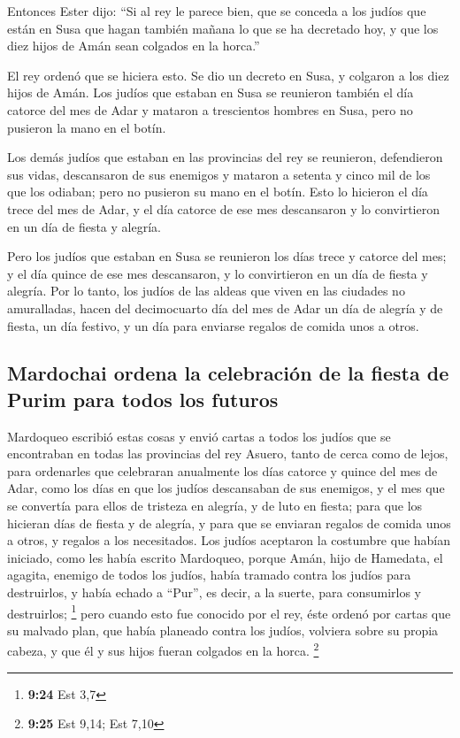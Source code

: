 \begin{paracol}{2}
 Entonces Ester dijo: ``Si al rey le parece bien, que se
conceda a los judíos que están en Susa que hagan también mañana lo que
se ha decretado hoy, y que los diez hijos de Amán sean colgados en la
horca.''

 El rey ordenó que se hiciera esto. Se dio un decreto en
Susa, y colgaron a los diez hijos de Amán.  Los judíos
que estaban en Susa se reunieron también el día catorce del mes de Adar
y mataron a trescientos hombres en Susa, pero no pusieron la mano en el
botín.

 Los demás judíos que estaban en las provincias del rey
se reunieron, defendieron sus vidas, descansaron de sus enemigos y
mataron a setenta y cinco mil de los que los odiaban; pero no pusieron
su mano en el botín.  Esto lo hicieron el día trece del
mes de Adar, y el día catorce de ese mes descansaron y lo convirtieron
en un día de fiesta y alegría.

 Pero los judíos que estaban en Susa se reunieron los
días trece y catorce del mes; y el día quince de ese mes descansaron, y
lo convirtieron en un día de fiesta y alegría.  Por lo
tanto, los judíos de las aldeas que viven en las ciudades no
amuralladas, hacen del decimocuarto día del mes de Adar un día de
alegría y de fiesta, un día festivo, y un día para enviarse regalos de
comida unos a otros.

\hypertarget{mardochai-ordena-la-celebraciuxf3n-de-la-fiesta-de-purim-para-todos-los-futuros}{%
\subsection{Mardochai ordena la celebración de la fiesta de Purim para
todos los
futuros}\label{mardochai-ordena-la-celebraciuxf3n-de-la-fiesta-de-purim-para-todos-los-futuros}}

 Mardoqueo escribió estas cosas y envió cartas a todos
los judíos que se encontraban en todas las provincias del rey Asuero,
tanto de cerca como de lejos,  para ordenarles que
celebraran anualmente los días catorce y quince del mes de Adar,
 como los días en que los judíos descansaban de sus
enemigos, y el mes que se convertía para ellos de tristeza en alegría, y
de luto en fiesta; para que los hicieran días de fiesta y de alegría, y
para que se enviaran regalos de comida unos a otros, y regalos a los
necesitados.  Los judíos aceptaron la costumbre que
habían iniciado, como les había escrito Mardoqueo, 
porque Amán, hijo de Hamedata, el agagita, enemigo de todos los judíos,
había tramado contra los judíos para destruirlos, y había echado a
``Pur'', es decir, a la suerte, para consumirlos y destruirlos;
\footnote{\textbf{9:24} Est 3,7}  pero cuando esto fue
conocido por el rey, éste ordenó por cartas que su malvado plan, que
había planeado contra los judíos, volviera sobre su propia cabeza, y que
él y sus hijos fueran colgados en la horca. \footnote{\textbf{9:25} Est
  9,14; Est 7,10}


\end{paracol}
